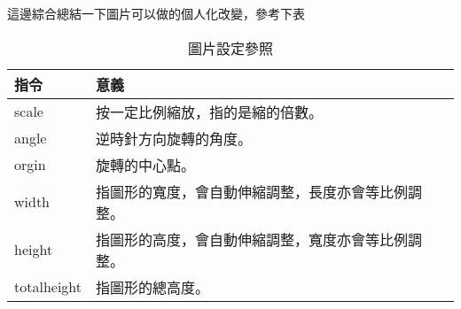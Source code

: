 \begin{center}
{\CB 這邊綜合總結一下圖片可以做的個人化改變，參考下表}
\end{center}
\bigskip
\begin{table}[h]
	\centering
	\caption{圖片設定參照}
	\begin{tabular}{p{2.5cm}l}
	指令 & 意義\\\toprule
	scale & 按一定比例縮放，指的是縮的倍數。\\
	angle & 逆時針方向旋轉的角度。\\
	orgin & 旋轉的中心點。\\
	width & 指圖形的寬度，會自動伸縮調整，長度亦會等比例調整。\\
	height & 指圖形的高度，會自動伸縮調整，寬度亦會等比例調整。\\
	totalheight & 指圖形的總高度。\\\bottomrule[1pt]
	\end{tabular}
\end{table}


